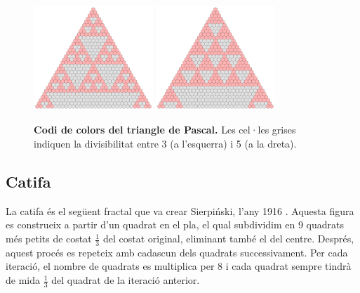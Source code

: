 \documentclass[12pt,a4paper]{report}
\begin{document}
\begin{figure}[!ht]
\begin{center}
\includegraphics[width=0.4\textwidth]{img/img03_11_01_pascal.pdf} 
\includegraphics[width=0.4\textwidth]{img/img03_11_02_pascal.pdf} 
\end{center}
\caption{\textbf{Codi de colors del triangle de Pascal.} Les cel·les grises indiquen la divisibilitat entre 3 (a l'esquerra) i 5 (a la dreta).}
\label{img03_11}
\end{figure}
\newpage
\subsection{Catifa}
La catifa és el següent fractal que va crear Sierpiński, l'any 1916 \cite[p.~79]{ChaosFractal}. Aquesta figura es construeix a partir d'un quadrat en el pla, el qual subdividim en 9 quadrats més petits de costat $\displaystyle\frac{1}{3}$ del costat original, eliminant també el del centre. Després, aquest procés es repeteix amb cadascun dels quadrats successivament. Per cada iteració, el nombre de quadrats es multiplica per 8 i cada quadrat sempre tindrà de mida $\displaystyle\frac{1}{3}$ del quadrat de la iteració anterior.
\end{document}
